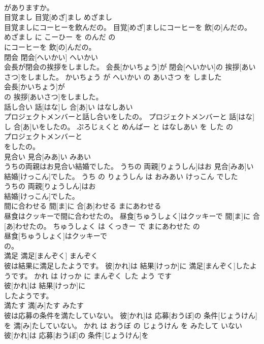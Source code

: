 \documentclass[8pt]{extreport}
\begin{document}
\begin{CJK}{UTF8}{min}
\\	がありますか。			
\\	目覚まし	目覚[めざ]まし	めざまし	
\\	目覚ましにコーヒーを飲んだの。	目覚[めざ]ましにコーヒーを 飲[の]んだの。	めざまし に こーひー を のんだ の	
\\	にコーヒーを 飲[の]んだの。			
\\	閉会	閉会[へいかい]	へいかい	
\\	会長が閉会の挨拶をしました。	会長[かいちょう]が 閉会[へいかい]の 挨拶[あいさつ]をしました。	かいちょう が へいかい の あいさつ を しました	
\\	会長[かいちょう]が
\\	の 挨拶[あいさつ]をしました。			
\\	話し合い	話[はな]し 合[あ]い	はなしあい	
\\	プロジェクトメンバーと話し合いをしたの。	プロジェクトメンバーと 話[はな]し 合[あ]いをしたの。	ぷろじぇくと めんばー と はなしあい を した の	
\\	プロジェクトメンバーと
\\	をしたの。			
\\	見合い	見合[みあ]い	みあい	
\\	うちの両親はお見合い結婚でした。	うちの 両親[りょうしん]はお 見合[みあ]い 結婚[けっこん]でした。	うち の りょうしん は おみあい けっこん でした	
\\	うちの 両親[りょうしん]はお
\\	結婚[けっこん]でした。			
\\	間に合わせる	間[ま]に 合[あ]わせる	まにあわせる	
\\	昼食はクッキーで間に合わせたの。	昼食[ちゅうしょく]はクッキーで 間[ま]に 合[あ]わせたの。	ちゅうしょく は くっきー で まにあわせた の	
\\	昼食[ちゅうしょく]はクッキーで
\\	の。			
\\	満足	満足[まんぞく]	まんぞく	
\\	彼は結果に満足したようです。	彼[かれ]は 結果[けっか]に 満足[まんぞく]したようです。	かれ は けっか に まんぞく した よう です	
\\	彼[かれ]は 結果[けっか]に
\\	したようです。			
\\	満たす	満[み]たす	みたす	
\\	彼は応募の条件を満たしていない。	彼[かれ]は 応募[おうぼ]の 条件[じょうけん]を 満[み]たしていない。	かれ は おうぼ の じょうけん を みたして いない	
\\	彼[かれ]は 応募[おうぼ]の 条件[じょうけん]を

\end{CJK}
\end{document}
